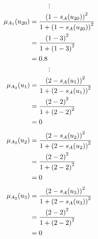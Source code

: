 \documentclass[a4paper]{book}
\begin{document}
				\[
					\vdots
				\]
				\begin{align}
					\mu_{A_1}(u_{20}) &= \frac{\left(1-s_A(u_{20})\right)^2}{1 + \left(1-s_A(u_{20})\right)^2}\\
					&= \frac{\left(1-3\right)^2}{1 + \left(1-3\right)^2} \notag \\
					&= 0.8 \notag
				\end{align}
				\[
					\vdots
				\]
				\begin{align}
					\mu_{A_2}(u_1) &= \frac{\left(2-s_A(u_1)\right)^2}{1 + \left(2-s_A(u_1)\right)^2}\\
					&= \frac{\left(2-2\right)^2}{1 + \left(2-2\right)^2} \notag \\
					&= 0 \notag
				\end{align}
				\begin{align}
					\mu_{A_2}(u_2) &= \frac{\left(2-s_A(u_2)\right)^2}{1 + \left(2-s_A(u_2)\right)^2}\\
					&= \frac{\left(2-2\right)^2}{1 + \left(2-2\right)^2} \notag \\
					&= 0 \notag
				\end{align}
				\begin{align}
					\mu_{A_2}(u_3) &= \frac{\left(2-s_A(u_3)\right)^2}{1 + \left(2-s_A(u_3)\right)^2}\\
					&= \frac{\left(2-2\right)^2}{1 + \left(2-2\right)^2} \notag \\
					&= 0 \notag
				\end{align}
\end{document}
